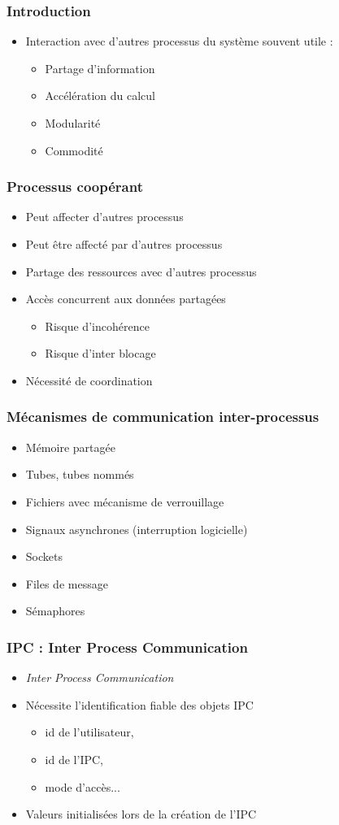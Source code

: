 \begin{frame}
\frametitle{Introduction}
\begin{itemize}
\item Interaction avec d’autres processus du système souvent utile :
\begin{itemize}
\item Partage d’information
\item Accélération du calcul
\item Modularité
\item Commodité
\end{itemize}
\end{itemize}
\end{frame}

\begin{frame}
\frametitle{Processus coopérant}
\begin{itemize}
\item Peut affecter d’autres processus
\item Peut être affecté par d’autres processus
\item Partage des ressources avec d’autres processus
\item Accès concurrent aux données partagées
\begin{itemize}
\item Risque d’incohérence
\item Risque d’inter blocage
\end{itemize}
\item Nécessité de coordination
\end{itemize}
\end{frame}

\begin{frame}
\frametitle{Mécanismes de communication inter-processus}
\begin{itemize}
\item Mémoire partagée
\item Tubes, tubes nommés
\item Fichiers avec mécanisme de verrouillage
\item Signaux asynchrones (interruption logicielle)
\item Sockets
\item Files de message
\item Sémaphores
\end{itemize}
\end{frame}

\begin{frame}
\frametitle{IPC : Inter Process Communication}
\begin{itemize}
\item \textit{Inter Process Communication}
\item Nécessite l’identification fiable des objets IPC
\begin{itemize}
\item id de l’utilisateur,
\item id de l’IPC,
\item mode d’accès...
\end{itemize}
\item Valeurs initialisées lors de la création de l’IPC
\end{itemize}
\end{frame}


